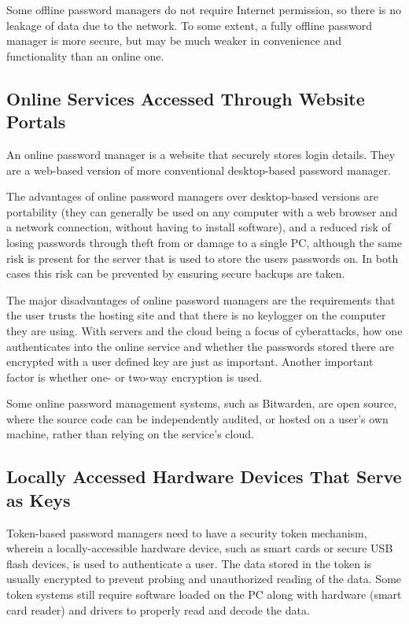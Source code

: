 Some offline password managers do not require Internet permission, so there is no leakage of data due to the network. To some extent, a fully offline password manager is more secure, but may be much weaker in convenience and functionality than an online one.


\subsection{Online Services Accessed Through Website Portals}

An online password manager is a website that securely stores login details. They are a web-based version of more conventional desktop-based password manager.

The advantages of online password managers over desktop-based versions are portability (they can generally be used on any computer with a web browser and a network connection, without having to install software), and a reduced risk of losing passwords through theft from or damage to a single PC, although the same risk is present for the server that is used to store the users passwords on. In both cases this risk can be prevented by ensuring secure backups are taken.

The major disadvantages of online password managers are the requirements that the user trusts the hosting site and that there is no keylogger on the computer they are using. With servers and the cloud being a focus of cyberattacks, how one authenticates into the online service and whether the passwords stored there are encrypted with a user defined key are just as important. Another important factor is whether one- or two-way encryption is used.

Some online password management systems, such as Bitwarden, are open source, where the source code can be independently audited, or hosted on a user's own machine, rather than relying on the service's cloud.

\subsection{Locally Accessed Hardware Devices That Serve as Keys}

Token-based password managers need to have a security token mechanism, wherein a locally-accessible hardware device, such as smart cards or secure USB flash devices, is used to authenticate a user. The data stored in the token is usually encrypted to prevent probing and unauthorized reading of the data. Some token systems still require software loaded on the PC along with hardware (smart card reader) and drivers to properly read and decode the data.

